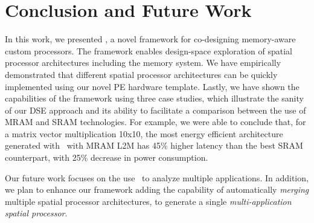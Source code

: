 \section{Conclusion and Future Work}
In this work, we presented \frameworkname, a novel framework for co-designing memory-aware custom processors.
The framework enables design-space exploration of spatial processor architectures including the memory system. We have empirically demonstrated that different spatial processor architectures can be quickly implemented using our novel PE hardware template. Lastly, we have shown the capabilities of the framework using three case studies, which illustrate the sanity of our DSE approach and its ability to facilitate a comparison between the use of MRAM and SRAM technologies.
For example, we were able to conclude that, for a matrix vector multiplication 10x10, the most energy efficient architecture generated with \frameworkname~with MRAM L2M has 45\% higher latency than the best SRAM counterpart, with 25\% decrease in power consumption.

Our future work focuses on the use \frameworkname~to analyze multiple applications. In addition, we plan to enhance our framework adding the capability of automatically \textit{merging} multiple spatial processor architectures, to generate a single \textit{multi-application spatial processor}.
